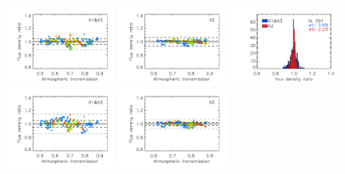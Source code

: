\begin{figure}[ht!]
\begin{center}
    \includegraphics[clip=true, trim={0.9cm, 0.2cm, 0, 0.6cm}, width=0.32\textwidth]{Figures/Calibration/plot_flux_density_ratio_obstau_allbright_corrected_skydip_photocorr_demo_narrow_1mm.pdf}
    \includegraphics[clip=true, trim={0.9cm, 0.2cm, 0, 0.6cm}, width=0.32\textwidth]{Figures/Calibration/plot_flux_density_ratio_obstau_allbright_corrected_skydip_photocorr_demo_narrow_a2.pdf}
    \includegraphics[clip=true, trim={0.9cm, 0.2cm, 0, 0.6cm}, width=0.32\textwidth]{Figures/Calibration/plot_histo_flux_density_ratio_obstau_allbright_corrected_skydip_photocorr_demo_narrow_1n2mm.pdf}
    \includegraphics[clip=true, trim={0.9cm, 0.2cm, 0, 0.6cm}, width=0.32\textwidth]{Figures/Calibration/plot_flux_density_ratio_obstau_allbright_corrected_skydip_photocorr_pointing_narrow_1mm.pdf}
    \includegraphics[clip=true, trim={0.9cm, 0.2cm, 0, 0.6cm}, width=0.32\textwidth]{Figures/Calibration/plot_flux_density_ratio_obstau_allbright_corrected_skydip_photocorr_pointing_narrow_a2.pdf}

\end{center}
\end{figure}
